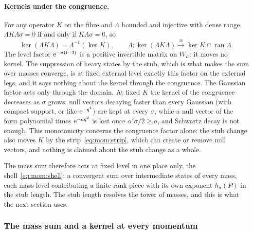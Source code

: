 \paragraph{Kernels under the congruence.}
For any operator $K$ on the fibre and $\Lambda$ bounded and injective with dense range, $\Lambda K \Lambda \sigma = 0$ if and only if $K \Lambda \sigma = 0$, so
\begin{equation}
  \label{eq:mom:congruence-kernel}
  \ker (\Lambda K \Lambda)
    = \Lambda^{-1} (\ker K),
  \qquad
  \Lambda : \ker (\Lambda K \Lambda) \xrightarrow{\ \cong\ } \ker K \cap \operatorname{ran} \Lambda.
\end{equation}
The level factor $\mathrm{e}^{- \sigma (\hat l - 2)}$ is a positive invertible matrix on $W_L$: it moves no kernel.
The suppression of heavy states by the stub, which is what makes the sum over masses converge, is at fixed external level exactly this factor on the external legs, and it says nothing about the kernel through the congruence.
The Gaussian factor acts only through the domain.
At fixed $K$ the kernel of the congruence decreases as $\sigma$ grows: null vectors decaying faster than every Gaussian (with compact support, or like $\mathrm{e}^{- q^4}$) are kept at every $\sigma$, while a null vector of the form polynomial times $\mathrm{e}^{- a q^2}$ is lost once $\alpha' \sigma / 2 \ge a$, and Schwartz decay is not enough.
This monotonicity concerns the congruence factor alone: the stub change also moves $K$ by the strip~\eqref{eq:mom:strip}, which can create or remove null vectors, and nothing is claimed about the stub change as a whole.

The mass sum therefore acts at fixed level in one place only, the shell~\eqref{eq:mom:shell}: a convergent sum over intermediate states of every mass, each mass level contributing a finite-rank piece with its own exponent $h_n(P)$ in the stub length.
The stub length resolves the tower of masses, and this is what the next section uses.

\subsubsection{The mass sum and a kernel at every momentum}
\label{sec:mom:mass-sum}


